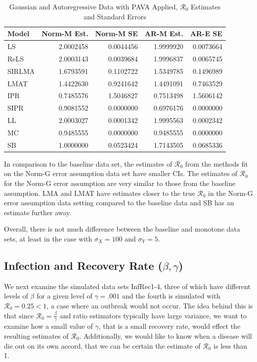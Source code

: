 \documentclass[12pt]{article}
\newcommand{\rr}{\ensuremath{\mathcal{R}_0}}
\begin{document}
\begin{table}[H]
	
	\centering
	\begin{tabular}[t]{l|r|r|r|r}
		\hline
		Model & Norm-M Est. & Norm-M SE & AR-M Est. & AR-E SE\\
		\hline
		LS & 2.0002458 & 0.0044456 & 1.9999920 & 0.0073664\\
		\hline
		ReLS & 2.0003143 & 0.0039684 & 1.9996837 & 0.0065745\\
		\hline
		SIRLMA & 1.6793591 & 0.1102722 & 1.5349785 & 0.1496989\\
		\hline
		LMAT & 1.4422630 & 0.9241642 & 1.4491091 & 0.7463529\\
		\hline
		IPR & 0.7485576 & 1.5046827 & 0.7513498 & 1.5606142\\
		\hline
		SIPR & 0.9081552 & 0.0000000 & 0.6976176 & 0.0000000\\
		\hline
		LL & 2.0003027 & 0.0001342 & 1.9995563 & 0.0002342\\
		\hline
		MC & 0.9485555 & 0.0000000 & 0.9485555 & 0.0000000\\
		\hline
		SB & 1.0000000 & 0.0523424 & 1.7143505 & 0.0685336\\
		\hline
	\end{tabular}
\caption{Gaussian and Autoregressive Data with PAVA Applied, $\rr$ Estimates and Standard Errors}\label{tab:pava-res}
\end{table}

In comparison to the baseline data set, the estimates of $\rr$ from the methods fit on the Norm-G error assumption data set have smaller CIs.  The estimates of $\rr$ for the Norm-G error assumption are very similar to those from the baseline assumption.  LMA and LMAT have estimates closer to the true $\rr$ in the Norm-G error assumption data setting compared to the baseline data and SB has an estimate further away.

Overall, there is not much difference between the baseline and monotone data sets, at least in the case with $\sigma_X=100$ and $\sigma_Y=5$.  

\subsection{Infection and Recovery Rate ($\beta, \gamma$)}\label{sec:res-beta-gamma}

We next examine the simulated data sets InfRec1-4, three of which have different levels of $\beta$ for a given level of $\gamma=.001$ and the fourth is simulated with $\rr=0.25 < 1$, a case where an outbreak would not occur.  The idea behind this is that since $\rr=\frac{\beta}{\gamma}$ and ratio estimators typically have large variance, we want to examine how a small value of $\gamma$, that is a small recovery rate, would effect the resulting estimates of $\rr$.  Additionally, we would like to know when a disease will die out on its own accord, that we can be certain the estimate of $\rr$ is less than 1.
\end{document}
